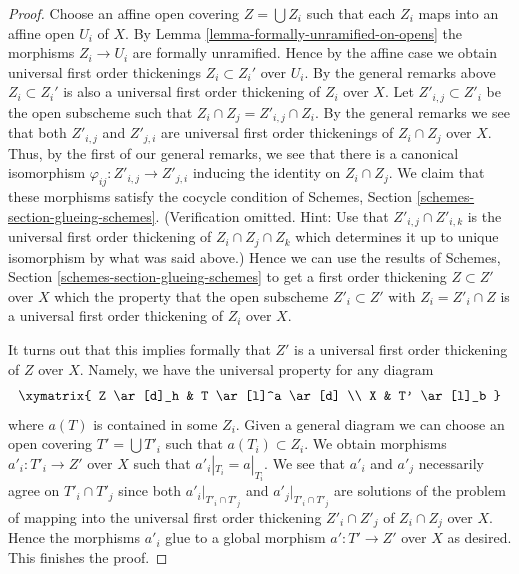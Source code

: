 \begin{proof}
\medskip\noindent
Choose an affine open covering $Z = \bigcup Z_i$ such that each $Z_i$
maps into an affine open $U_i$ of $X$. By
Lemma \ref{lemma-formally-unramified-on-opens}
the morphisms $Z_i \to U_i$ are formally unramified.
Hence by the affine case we obtain universal first order thickenings
$Z_i \subset Z_i'$ over $U_i$. By the general remarks above
$Z_i \subset Z_i'$ is also a universal first order thickening of
$Z_i$ over $X$. Let $Z'_{i, j} \subset Z'_i$ be the open subscheme
such that $Z_i \cap Z_j = Z'_{i, j} \cap Z_i$. By the general remarks
we see that both $Z'_{i, j}$ and $Z'_{j, i}$ are universal first
order thickenings of $Z_i \cap Z_j$ over $X$. Thus, by
the first of our general remarks, we see that there is a canonical isomorphism
$\varphi_{ij} : Z'_{i, j} \to Z'_{j, i}$ inducing the identity on
$Z_i \cap Z_j$. We claim that these morphisms satisfy the cocycle condition of
Schemes, Section \ref{schemes-section-glueing-schemes}.
(Verification omitted. Hint: Use that $Z'_{i, j} \cap Z'_{i, k}$ is the
universal first order thickening of $Z_i \cap Z_j \cap Z_k$ which determines
it up to unique isomorphism by what was said above.)
Hence we can use the results of
Schemes, Section \ref{schemes-section-glueing-schemes}
to get a first order thickening $Z \subset Z'$ over $X$ which the property
that the open subscheme $Z'_i \subset Z'$ with $Z_i = Z'_i \cap Z$
is a universal first order thickening of $Z_i$ over $X$.

\medskip\noindent
It turns out that this implies formally that $Z'$ is a universal first order
thickening of $Z$ over $X$. Namely, we have the universal property for any
diagram
$$
\xymatrix{
Z \ar[d]_h & T \ar[l]^a \ar[d] \\
X & T' \ar[l]_b
}
$$
where $a(T)$ is contained in some $Z_i$. Given a general diagram we can
choose an open covering $T' = \bigcup T'_i$ such that $a(T_i) \subset Z_i$.
We obtain morphisms $a'_i : T'_i \to Z'$ over $X$ such that
$a'_i|_{T_i} = a|_{T_i}$. We see that $a'_i$ and $a'_j$ necessarily agree
on $T'_i \cap T'_j$ since both $a'_i|_{T'_i \cap T'_j}$ and
$a'_j|_{T'_i \cap T'_j}$ are solutions of the problem of mapping into the
universal first order thickening $Z'_i \cap Z'_j$ of $Z_i \cap Z_j$ over $X$.
Hence the morphisms $a'_i$ glue to a global morphism
$a' : T' \to Z'$ over $X$ as desired. This finishes the proof.
\end{proof}

